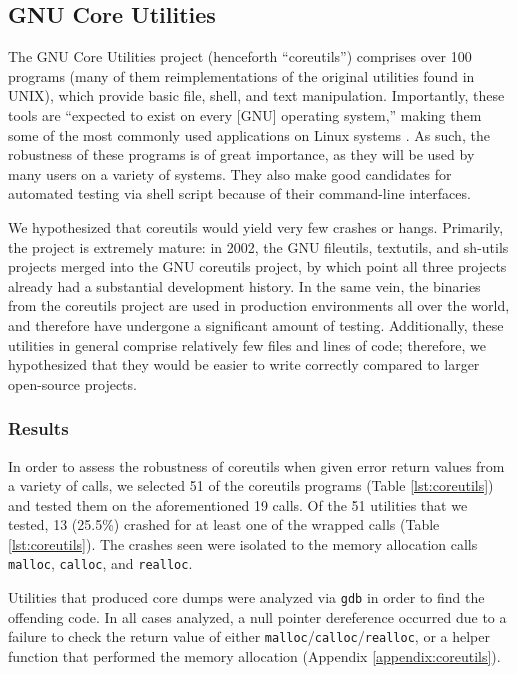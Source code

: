 \subsection{GNU Core Utilities}
The GNU Core Utilities project (henceforth ``coreutils'') comprises over 100 programs (many of them reimplementations of the original utilities found in UNIX), which provide basic file, shell, and text manipulation. Importantly, these tools are ``expected to exist on every [GNU] operating system,'' making them some of the most commonly used applications on Linux systems \cite{coreutils}. As such, the robustness of these programs is of great importance, as they will be used by many users on a variety of systems. They also make good candidates for automated testing via shell script because of their command-line interfaces.

We hypothesized that coreutils would yield very few crashes or hangs. Primarily, the project is extremely mature: in 2002, the GNU fileutils, textutils, and sh-utils projects merged into the GNU coreutils project, by which point all three projects already had a substantial development history. In the same vein, the binaries from the coreutils project are used in production environments all over the world, and therefore have undergone a significant amount of testing. Additionally, these utilities in general comprise relatively few files and lines of code; therefore, we hypothesized that they would be easier to write correctly compared to larger open-source projects.

\subsubsection{Results}
In order to assess the robustness of coreutils when given error return values from a variety of calls, we selected 51 of the coreutils programs (Table \ref{lst:coreutils}) and tested them on the aforementioned 19 calls. Of the 51 utilities that we tested, 13 (25.5\%) crashed for at least one of the wrapped calls (Table \ref{lst:coreutils}). The crashes seen were isolated to the memory allocation calls \texttt{malloc}, \texttt{calloc}, and \texttt{realloc}. 

Utilities that produced core dumps were analyzed via \texttt{gdb} in order to find the offending code. In all cases analyzed, a null pointer dereference occurred due to a failure to check the return value of either \texttt{malloc}/\texttt{calloc}/\texttt{realloc}, or a helper function that performed the memory allocation (Appendix \ref{appendix:coreutils}).

